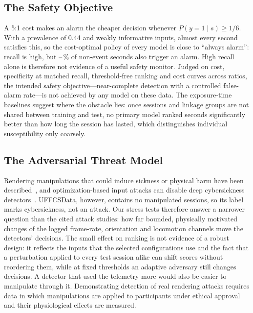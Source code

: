 \subsection{The Safety Objective}
A 5:1 cost makes an alarm the cheaper decision whenever $P(y=1\mid s)\ge1/6$. With a prevalence of 0.44 and weakly informative inputs, almost every second satisfies this, so the cost-optimal policy of every model is close to ``always alarm'': recall is high, but \DOneFPRMin--\DOneFPRMax\,\% of non-event seconds also trigger an alarm. High recall alone is therefore not evidence of a useful safety monitor. Judged on cost, specificity at matched recall, threshold-free ranking and cost curves across ratios, the intended safety objective---near-complete detection with a controlled false-alarm rate---is not achieved by any model on these data. The exposure-time baselines suggest where the obstacle lies: once sessions and linkage groups are not shared between training and test, no primary model ranked seconds significantly better than how long the session has lasted, which distinguishes individual susceptibility only coarsely.

\subsection{The Adversarial Threat Model}
Rendering manipulations that could induce sickness or physical harm have been described~\cite{odeleye2021framerate,tseng2022dark}, and optimization-based input attacks can disable deep cybersickness detectors~\cite{kundu2025securing,ahmed2025adversarialvr}. UFFCSData, however, contains no manipulated sessions, so its label marks cybersickness, not an attack. Our stress tests therefore answer a narrower question than the cited attack studies: how far bounded, physically motivated changes of the logged frame-rate, orientation and locomotion channels move the detectors' decisions. The small effect on ranking is not evidence of a robust design: it reflects the inputs that the selected configurations use and the fact that a perturbation applied to every test session alike can shift scores without reordering them, while at fixed thresholds an adaptive adversary still changes decisions. A detector that used the telemetry more would also be easier to manipulate through it. Demonstrating detection of real rendering attacks requires data in which manipulations are applied to participants under ethical approval and their physiological effects are measured.


